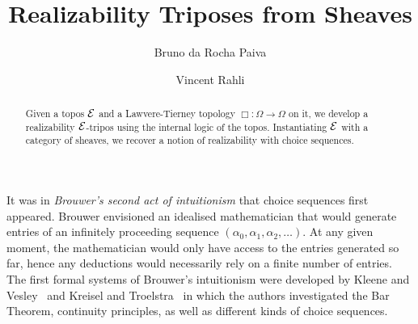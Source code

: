 \documentclass{easychair}
\title{Realizability Triposes from Sheaves}
\author{
 Bruno da Rocha Paiva%
\and
 Vincent Rahli%
}
\institute{
  University of Birmingham, United Kingdom
 }
\begin{document}
\maketitle

\begin{abstract}
  Given a topos \(\mathcal{E}\) and a Lawvere-Tierney topology
  \(\Box : \Omega \to \Omega\) on it, we develop a realizability \(\mathcal{E}\)-tripos
  using the internal logic of the topos.
  Instantiating \(\mathcal{E}\) with a category of sheaves, we recover a notion of
  realizability with choice sequences.
\end{abstract}



%
%



It was in \textit{Brouwer's second act of intuitionism} that choice sequences
first appeared.
%
Brouwer envisioned an idealised mathematician that would
generate entries of an infinitely proceeding sequence
\((\alpha_{0}, \alpha_{1}, \alpha_{2}, \dots)\).
%
At any given moment, the mathematician would only have access to the entries
generated so far, hence any deductions would necessarily rely on a finite number
of entries.
%
The first formal systems of Brouwer's intuitionism were developed by
Kleene and Vesley~\cite{kleeneFoundationsIntuitionisticMathematics1965}
and Kreisel and Troelstra~\cite{kreiselFormalSystemsBranches1970} in which
the authors investigated the Bar Theorem, continuity principles, as well
as different kinds of choice sequences.
\end{document}
